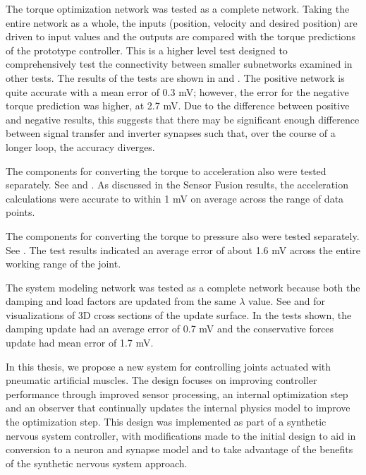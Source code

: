 
The torque optimization network was tested as a complete network. Taking the entire network as a whole, the inputs (position, velocity and desired position) are driven to input values and the outputs are compared with the torque predictions of the prototype controller. This is a higher level test designed to comprehensively test the connectivity between smaller subnetworks examined in other tests. The results of the tests are shown in  and . The positive network is quite accurate with a mean error of 0.3 mV; however,
the error for the negative torque prediction was higher, at 2.7 mV. Due to the difference between positive and negative results, this suggests that there may be significant enough difference between signal transfer and inverter synapses such that, over the course of a longer loop, the accuracy diverges.

The components for converting the torque to
acceleration also were tested
separately. See  and . As discussed in the Sensor Fusion results, the acceleration calculations were accurate to within 1 mV on average across the range of data points.

The components for converting the torque to pressure also were tested
separately. See .
The test results indicated an average error of about 1.6 mV across the entire
working range of the joint.


The system modeling network was tested as a complete network because both the
damping and load factors are updated from the same $\lambda$ value. See 
 and 
for visualizations of 3D cross sections of the update surface. In the tests shown,
the damping update had an average error of 0.7 mV
and the conservative forces update had mean error of 1.7 mV.

\label{chap:discussion}


In this thesis, we propose a new system for controlling joints actuated with
pneumatic artificial muscles. The design focuses on improving controller
performance through improved sensor processing, an internal optimization step
and an observer that continually updates the internal physics model to improve
the optimization step. This design was implemented as part of a synthetic
nervous system controller, with modifications made to the initial design to aid
in conversion to a neuron and synapse model and to take advantage of the benefits of the
synthetic nervous system approach.

